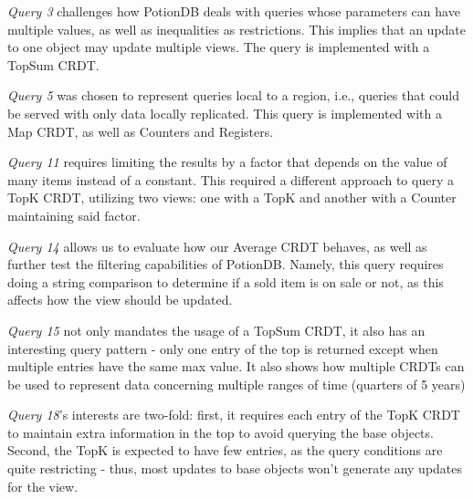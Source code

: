 \documentclass[sigconf, nonacm]{acmart}
\begin{document}
\begin{compactitem}
	\item \emph{Query 3} challenges how PotionDB deals with queries whose parameters can have multiple values, as well as inequalities as restrictions. 
	This implies that an update to one object may update multiple views. 
	The query is implemented with a TopSum CRDT. %
	\item \emph{Query 5} was chosen to represent queries local to a region, i.e., queries that could be served with only data locally replicated. %
	This query is implemented with a Map CRDT, as well as Counters and Registers.
	\item \emph{Query 11} requires limiting the results by a factor that depends on the value of many items instead of a constant.
	This required a different approach to query a TopK CRDT, utilizing two views: one with a TopK and another with a Counter maintaining said factor.
	\item \emph{Query 14} allows us to evaluate how our Average CRDT behaves, as well as further test the filtering capabilities of PotionDB.
	Namely, this query requires doing a string comparison to determine if a sold item is on sale or not, as this affects how the view should be updated.
	\item \emph{Query 15} not only mandates the usage of a TopSum CRDT, it also has an interesting query pattern - only one entry of the top is returned except when multiple entries have the same max value.
	It also shows how multiple CRDTs can be used to represent data concerning multiple ranges of time (quarters of 5 years)
	\item \emph{Query 18}'s interests are two-fold: %
	first, it requires each entry of the TopK CRDT to maintain extra information in the top to avoid querying the base objects.
	Second, the TopK is expected to have few entries, as the query conditions are quite restricting - thus, most updates to base objects won't generate any updates for the view.
\end{compactitem}
\end{document}
